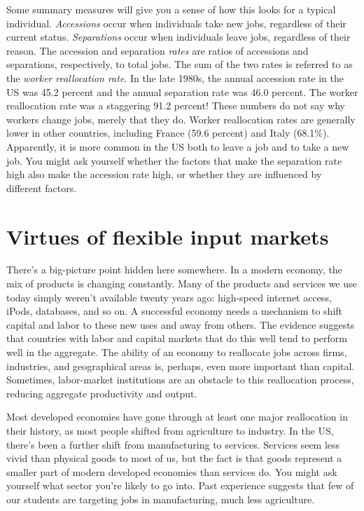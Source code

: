 Some summary measures will give you a sense of how this looks for
a typical individual.  {\it Accessions\/} occur when individuals
take new jobs, regardless of their current status. {\it
Separations\/} occur when individuals leave jobs, regardless of their
reason. The accession and separation {\it rates\/} are ratios of
accessions and separations, respectively, to total jobs.   The sum
of the two rates is referred to as the \textit{worker reallocation
rate}. In the late 1980s, the annual accession rate 
 in the US was
45.2 percent and the annual separation rate was 46.0 percent.  The worker
reallocation rate was a staggering 91.2 percent! These numbers do not
say why workers change jobs, merely that they do.
Worker reallocation rates are
generally lower in other countries, including France (59.6 percent) and
Italy (68.1\%). Apparently, it is more common in the US both to
leave a job and to take a new job.
You might ask yourself whether the factors that make the separation rate
high also make the accession rate 
 high, or whether they are
influenced by different factors.


\section{Virtues of flexible input markets}


There's a big-picture point hidden here somewhere.
In a modern economy, the mix of products is changing constantly.
Many of the products and services we use today
simply weren't available twenty years ago:
high-speed internet access, iPods, databases, and so on.
A successful economy needs a mechanism to shift
capital and labor to these new uses and away from others.
The evidence suggests that countries with labor and capital markets
that do this well tend to perform well in the aggregate.
The ability of an economy to reallocate jobs across
firms, industries, and geographical areas is,
perhaps, even more important than capital.
Sometimes, labor-market institutions are an obstacle to this
reallocation process,
reducing aggregate productivity and output.


Most developed economies have gone through at least one
major reallocation in their history,
as most people shifted from agriculture to industry.
In the US, there's been a further shift from manufacturing to services.
Services seem less vivid than physical goods to most of us,
but the fact is that goods represent a smaller part of modern
developed economies than services do.
You might ask yourself what sector you're likely to go into.
Past experience suggests that few of our students are targeting jobs
in manufacturing, much less agriculture.

